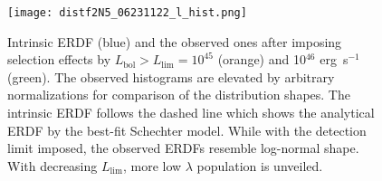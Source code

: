 \documentclass[twocolumn, twocolappendix]{aastex63}
\newcommand{\Lbol}{L_\mathrm{bol}}
\begin{document}
\begin{CJK*}{UTF8}{gbsn}
\begin{figure}
\centering
\texttt{[image: distf2N5\_06231122\_l\_hist.png]}
\caption{
Intrinsic ERDF (blue) and the observed ones after imposing selection effects by $\Lbol>L_\mathrm{lim}=10^{45}$ (orange) and 10$^{46}$ erg~s$^{-1}$ (green).
The observed histograms are elevated by arbitrary normalizations for comparison of the distribution shapes.
The intrinsic ERDF follows the dashed line which shows the analytical ERDF by the best-fit Schechter model. 
While with the detection limit imposed, the observed ERDFs resemble log-normal shape. 
With decreasing $L_\mathrm{lim}$, more low $\lambda$ population is unveiled.
}
\label{fig:lhist}
\end{figure}
  



%





\end{CJK*}
\end{document}
